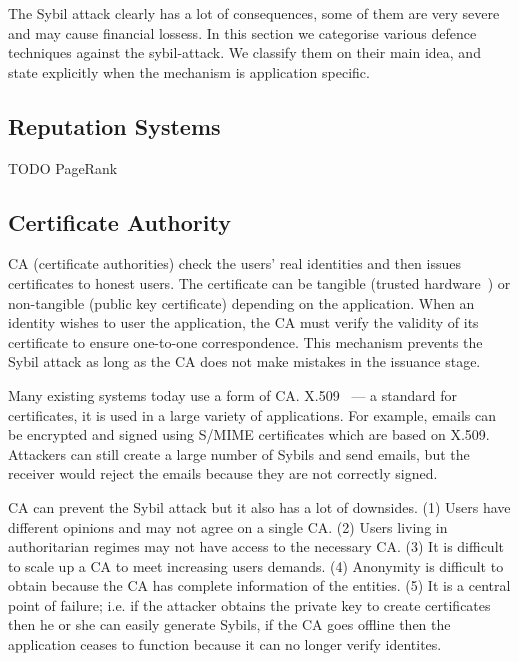 The Sybil attack clearly has a lot of consequences, some of them are very severe
and may cause financial lossess. In this section we categorise various defence
techniques against the sybil-attack. We classify them on their main idea, and
state explicitly when the mechanism is application specific.

\subsection{Reputation Systems}
TODO PageRank\cite{baeza2005pagerank, cheng2006manipulability}

\subsection{Certificate Authority}\label{sec:cert-authority}
CA (certificate authorities) check the users' real identities and then issues
certificates to honest users. The certificate can be tangible (trusted
hardware~\cite{newsome2004sybil}) or non-tangible (public key certificate)
depending on the application. When an identity wishes to user the application,
the CA must verify the validity of its certificate to ensure one-to-one
correspondence. This mechanism prevents the Sybil attack as long as the CA does
not make mistakes in the issuance stage.

Many existing systems today use a form of CA. X.509~\cite{housley2002internet}
--- a standard for certificates, it is used in a large variety of applications.
For example, emails can be encrypted and signed using
S/MIME\cite{ramsdell2010secure} certificates which are based on X.509. Attackers
can still create a large number of Sybils and send emails, but the receiver
would reject the emails because they are not correctly signed.

CA can prevent the Sybil attack but it also has a lot of downsides. (1) Users
have different opinions and may not agree on a single CA. (2) Users living in
authoritarian regimes may not have access to the necessary CA. (3) It is
difficult to scale up a CA to meet increasing users demands. (4) Anonymity is
difficult to obtain because the CA has complete information of the entities. (5)
It is a central point of failure; i.e. if the attacker obtains the private key
to create certificates then he or she can easily generate Sybils, if the CA goes
offline then the application ceases to function because it can no longer verify
identites.

